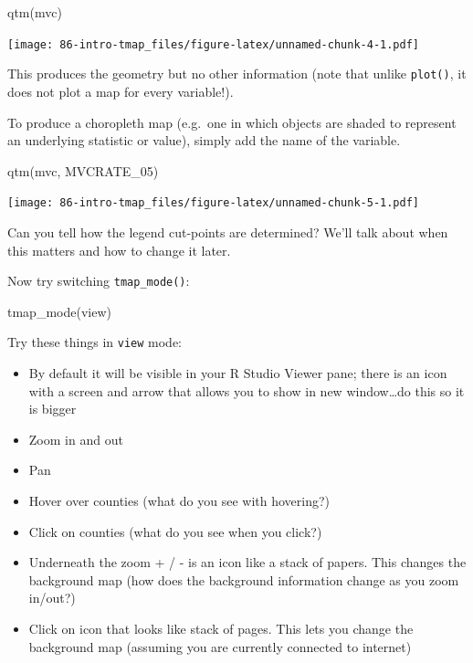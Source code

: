 \documentclass[
]{book}
\newenvironment{Shaded}{\begin{snugshade}}{\end{snugshade}}
\newcommand{\FunctionTok}[1]{\textcolor[rgb]{0.00,0.00,0.00}{#1}}
\newcommand{\NormalTok}[1]{#1}
\newcommand{\StringTok}[1]{\textcolor[rgb]{0.31,0.60,0.02}{#1}}
\providecommand{\tightlist}{%
  \setlength{\itemsep}{0pt}\setlength{\parskip}{0pt}}
\begin{document}
\begin{Shaded}
\begin{Highlighting}[]
\FunctionTok{qtm}\NormalTok{(mvc)}
\end{Highlighting}
\end{Shaded}

\texttt{[image: 86-intro-tmap\_files/figure-latex/unnamed-chunk-4-1.pdf]}

This produces the geometry but no other information (note that unlike \texttt{plot()}, it does not plot a map for every variable!).

To produce a choropleth map (e.g.~one in which objects are shaded to represent an underlying statistic or value), simply add the name of the variable.

\begin{Shaded}
\begin{Highlighting}[]
\FunctionTok{qtm}\NormalTok{(mvc, }\StringTok{\textquotesingle{}MVCRATE\_05\textquotesingle{}}\NormalTok{)}
\end{Highlighting}
\end{Shaded}

\texttt{[image: 86-intro-tmap\_files/figure-latex/unnamed-chunk-5-1.pdf]}

Can you tell how the legend cut-points are determined? We'll talk about when this matters and how to change it later.

Now try switching \texttt{tmap\_mode()}:

\begin{Shaded}
\begin{Highlighting}[]
\FunctionTok{tmap\_mode}\NormalTok{(}\StringTok{\textquotesingle{}view\textquotesingle{}}\NormalTok{)}
\end{Highlighting}
\end{Shaded}

Try these things in \texttt{view} mode:

\begin{itemize}
\tightlist
\item
  By default it will be visible in your R Studio Viewer pane; there is an icon with a screen and arrow that allows you to show in new window\ldots do this so it is bigger
\item
  Zoom in and out
\item
  Pan
\item
  Hover over counties (what do you see with hovering?)
\item
  Click on counties (what do you see when you click?)
\item
  Underneath the zoom + / - is an icon like a stack of papers. This changes the background map (how does the background information change as you zoom in/out?)
\item
  Click on icon that looks like stack of pages. This lets you change the background map (assuming you are currently connected to internet)
\end{itemize}
\end{document}
